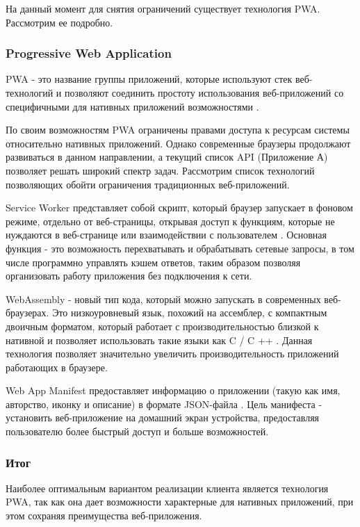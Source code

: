На данный момент для снятия ограничений существует технология PWA. Рассмотрим ее подробно.


\subsubsection{Progressive Web Application}

PWA - это название группы приложений, которые используют стек веб-технологий и позволяют соединить простоту использования веб-приложений со специфичными для нативных приложений  возможностями \cite{progressive-web-applications}.

По своим возможностям PWA ограничены правами доступа к ресурсам системы относительно нативных приложений.
Однако современные браузеры продолжают развиваться в данном направлении, а текущий список API (Приложение А) позволяет решать широкий спектр задач.
Рассмотрим список технологий позволяющих обойти ограничения традиционных веб-приложений.

Service Worker представляет собой скрипт, который браузер запускает в фоновом режиме, отдельно от веб-страницы, открывая доступ к функциям, которые не нуждаются в веб-странице или взаимодействии с пользователем \cite{service-worker}.
Основная функция - это возможность перехватывать и обрабатывать сетевые запросы, в том числе программно управлять кэшем ответов, таким образом позволяя организовать работу приложения без подключения к сети.

WebAssembly - новый тип кода, который можно запускать в современных веб-браузерах. Это низкоуровневый язык, похожий на ассемблер, с компактным двоичным форматом, который работает с производительностью близкой к нативной и позволяет использовать такие языки как C / C ++ \cite{web-assembly}.
Данная технология позволяет значительно увеличить производительность приложений работающих в браузере.

Web App Manifest предоставляет информацию о приложении (такую как имя, авторство, иконку и описание) в формате JSON-файла \cite{web-app-manifest}.
Цель манифеста - установить веб-приложение на домашний экран устройства, предоставляя пользователю более быстрый доступ и больше возможностей.

\subsubsection{Итог}

Наиболее оптимальным вариантом реализации клиента является технология PWA, так как она дает возможности характерные для нативных приложений, при этом сохраняя преимущества веб-приложения.
